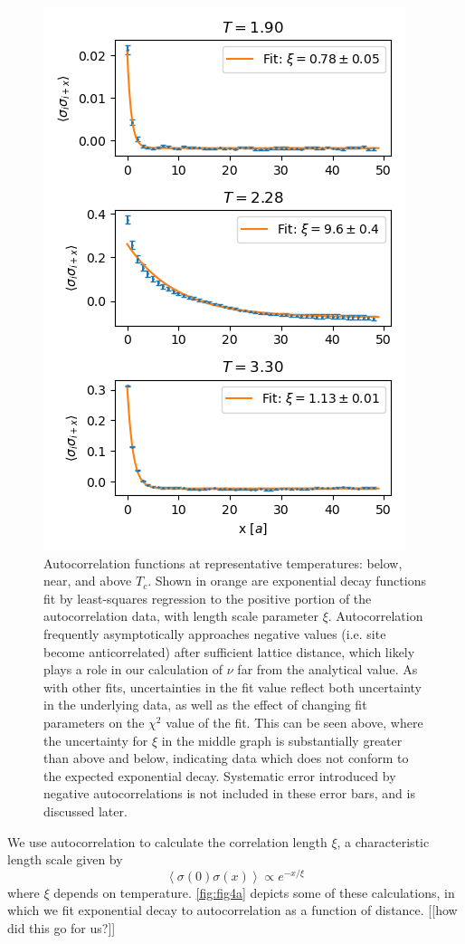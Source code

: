 \documentclass[letter,scriptaddress,twocolumn, prl,nofootinbib]{revtex4}
\newcommand{\submin}[1]{\left\langle #1 \right\rangle}
\begin{document}
\begin{figure}[h]
	\begin{center}
		\includegraphics[width=.5\textwidth]{figs/fig4_autocors.png}
		\caption{Autocorrelation functions at representative temperatures: below, near, and above $T_c$. Shown in orange are exponential decay functions fit by least-squares regression to the positive portion of the autocorrelation data, with length scale parameter $\xi$. Autocorrelation frequently asymptotically approaches negative values (i.e. site become anticorrelated) after sufficient lattice distance, which likely plays a role in our calculation of $\nu$ far from the analytical value. As with other fits, uncertainties in the fit value reflect both uncertainty in the underlying data, as well as the effect of changing fit parameters on the $\chi^2$ value of the fit. This can be seen above, where the uncertainty for $\xi$ in the middle graph is substantially greater than above and below, indicating data which does not conform to the expected exponential decay. Systematic error introduced by negative autocorrelations is not included in these error bars, and is discussed later.}
		\label{fig:fig4a}
	\end{center}
\end{figure}

We use autocorrelation to calculate the correlation length $\xi$, a characteristic length scale given by
\begin{equation}
	\label{eq:xi}
	\submin{\sigma(0)\sigma(x)} \propto e^{-x/\xi}
\end{equation}
where $\xi$ depends on temperature. \autoref{fig:fig4a} depicts some of these calculations, in which we fit exponential decay to autocorrelation as a function of distance. [[how did this go for us?]]
\end{document}
